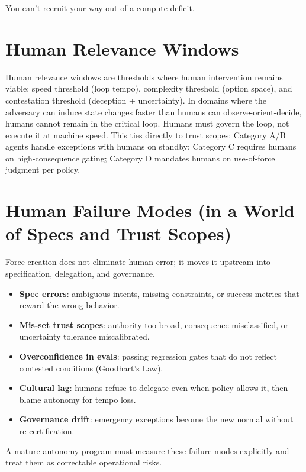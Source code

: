 \documentclass[11pt]{article}
\begin{document}
\begin{calloutquote}
You can't recruit your way out of a compute deficit.
\end{calloutquote}

\section{Human Relevance Windows}\label{human-relevance-windows}

Human relevance windows are thresholds where human intervention remains viable: speed threshold (loop tempo), complexity threshold (option space), and contestation threshold (deception + uncertainty). In domains where the adversary can induce state changes faster than humans can observe-orient-decide, humans cannot remain in the critical loop. Humans must govern the loop, not execute it at machine speed. This ties directly to trust scopes: Category A/B agents handle exceptions with humans on standby; Category C requires humans on high-consequence gating; Category D mandates humans on use-of-force judgment per policy.

\section{Human Failure Modes (in a World of Specs and Trust Scopes)}\label{human-failure-modes}

Force creation does not eliminate human error; it moves it upstream into specification, delegation, and governance.

\begin{itemize}
\item \textbf{Spec errors}: ambiguous intents, missing constraints, or success metrics that reward the wrong behavior.
\item \textbf{Mis-set trust scopes}: authority too broad, consequence misclassified, or uncertainty tolerance miscalibrated.
\item \textbf{Overconfidence in evals}: passing regression gates that do not reflect contested conditions (Goodhart's Law).
\item \textbf{Cultural lag}: humans refuse to delegate even when policy allows it, then blame autonomy for tempo loss.
\item \textbf{Governance drift}: emergency exceptions become the new normal without re-certification.
\end{itemize}

A mature autonomy program must measure these failure modes explicitly and treat them as correctable operational risks.
\end{document}
